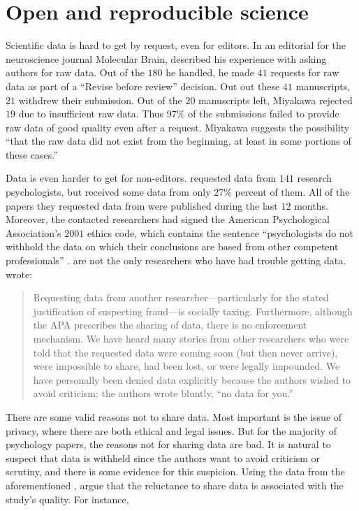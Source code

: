 \section{Open and reproducible science}

Scientific data is hard to get by request, even for editors. In an editorial for the neuroscience journal Molecular Brain, \cite{Miyakawa2020-ze} described his experience with asking authors for raw data. Out of the $180$ he handled, he made $41$ requests for raw data as part of a ``Revise before review'' decision. Out out these $41$ manuscripts, $21$ withdrew their submission. Out of the $20$ manuscripts left, Miyakawa rejected $19$ due to insufficient raw data. Thus $97\%$ of the submissions failed to provide raw data of good quality even after a request. Miyakawa suggests the possibility ``that the raw data did not exist from the beginning, at least in some portions of these cases.''

Data is even harder to get for non-editors. \cite{Wicherts2006-yy} requested data from $141$ research psychologists, but received some data from only $27\%$ percent of them. All of the papers they requested data from were published during the last $12$ months. Moreover, the contacted researchers had signed the American Psychological Association's $2001$ ethics code, which contains the sentence ``psychologists do not withhold the data on which their conclusions are based from other competent professionals'' \parencite[p. 396; as cited in Wicherts et al. 2006][]{American_Psychological_Association2001-rs}.
\cite{Wicherts2006-yy} are not the only researchers who have had
trouble getting data. \cite[p. 526]{Nelson2018-ov} wrote: 
\begin{quote}
Requesting data from another researcher---particularly for the stated
justification of suspecting fraud---is socially taxing. Furthermore,
although the APA prescribes the sharing of data, there is no enforcement
mechanism. We have heard many stories from other researchers who were
told that the requested data were coming soon (but then never arrive),
were impossible to share, had been lost, or were legally impounded.
We have personally been denied data explicitly because the authors
wished to avoid criticism; the authors wrote bluntly, \textquotedblleft no
data for you.''
\end{quote}
There are some valid reasons not to share data. Most important is
the issue of privacy, where there are both ethical and legal issues.
But for the majority of psychology papers, the reasons not for sharing
data are bad. It is natural to suspect that data is withheld since
the authors want to avoid criticism or scrutiny, and there is some
evidence for this suspicion. Using the data from the aforementioned
\parencite{Wicherts2006-yy}, \cite{Wicherts2011-eb} argue that the
reluctance to share data is associated with the study's quality. For
instance, 


